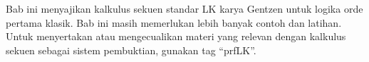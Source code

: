 \documentclass[../../../include/open-logic-chapter]{subfiles}
\begin{document}
      {}
      {}

\begin{editorial}
  Bab ini menyajikan kalkulus sekuen standar LK karya Gentzen untuk
  logika orde pertama klasik. Bab ini masih memerlukan lebih banyak
  contoh dan latihan. Untuk menyertakan atau mengecualikan materi yang
  relevan dengan kalkulus sekuen sebagai sistem pembuktian, gunakan tag
  ``prfLK''.
\end{editorial}














\OLEndChapterHook
\end{document}
